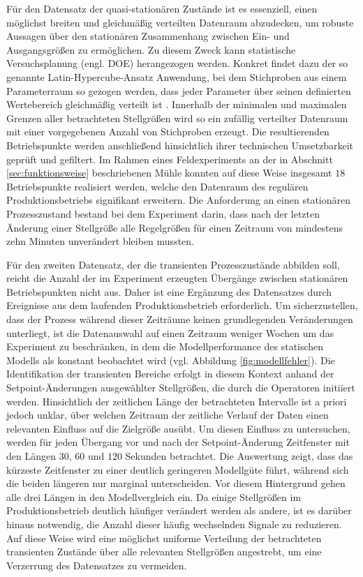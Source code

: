 Für den Datensatz der quasi-stationären Zustände ist es essenziell, einen möglichst breiten und gleichmäßig verteilten Datenraum abzudecken, um robuste Aussagen über den stationären Zusammenhang zwischen Ein- und Ausgangsgrößen zu ermöglichen. Zu diesem Zweck kann statistische Versuchsplanung (engl. \ac{DOE}) herangezogen werden. Konkret findet dazu der so genannte Latin-Hypercube-Ansatz Anwendung, bei dem Stichproben aus einem Parameterraum so gezogen werden, dass jeder Parameter über seinen definierten Wertebereich gleichmäßig verteilt ist \cite{mckay.2000}.
Innerhalb der minimalen und maximalen Grenzen aller betrachteten Stellgrößen wird so ein zufällig verteilter Datenraum mit einer vorgegebenen Anzahl von Stichproben erzeugt. Die resultierenden Betriebspunkte werden anschließend hinsichtlich ihrer technischen Umsetzbarkeit geprüft und gefiltert. Im Rahmen eines Feldexperiments an der in Abschnitt \ref{sec:funktionsweise} beschriebenen Mühle konnten auf diese Weise insgesamt $18$ Betriebspunkte realisiert werden, welche den Datenraum des regulären Produktionsbetriebs signifikant erweitern. Die Anforderung an einen stationären Prozesszustand bestand bei dem Experiment darin, dass nach der letzten Änderung einer Stellgröße alle Regelgrößen für einen Zeitraum von mindestens zehn Minuten unverändert bleiben mussten. \par
Für den zweiten Datensatz, der die transienten Prozesszustände abbilden soll, reicht die Anzahl der im Experiment erzeugten Übergänge zwischen stationären Betriebspunkten nicht aus. Daher ist eine Ergänzung des Datensatzes durch Ereignisse aus dem laufenden Produktionsbetrieb erforderlich. Um sicherzustellen, dass der Prozess während dieser Zeiträume keinen grundlegenden Veränderungen unterliegt, ist die Datenauswahl auf einen Zeitraum weniger Wochen um das Experiment zu beschränken, in dem die Modellperformance des statischen Modells als konstant beobachtet wird (vgl. Abbildung \ref{fig:modellfehler}).
Die Identifikation der transienten Bereiche erfolgt in diesem Kontext anhand der Setpoint-Änderungen ausgewählter Stellgrößen, die durch die Operatoren initiiert werden. Hinsichtlich der zeitlichen Länge der betrachteten Intervalle ist a priori jedoch unklar, über welchen Zeitraum der zeitliche Verlauf der Daten einen relevanten Einfluss auf die Zielgröße ausübt. Um diesen Einfluss zu untersuchen, werden für jeden Übergang vor und nach der Setpoint-Änderung Zeitfenster mit den Längen $30$, $60$ und $120$ Sekunden betrachtet. Die Auswertung zeigt, dass das kürzeste Zeitfenster zu einer deutlich geringeren Modellgüte führt, während sich die beiden längeren nur marginal unterscheiden. Vor diesem Hintergrund gehen alle drei Längen in den Modellvergleich ein. \newline
Da einige Stellgrößen im Produktionsbetrieb deutlich häufiger verändert werden als andere, ist es darüber hinaus notwendig, die Anzahl dieser häufig wechselnden Signale zu reduzieren. Auf diese Weise wird eine möglichst uniforme Verteilung der betrachteten transienten Zustände über alle relevanten Stellgrößen angestrebt, um eine Verzerrung des Datensatzes zu vermeiden.
%
